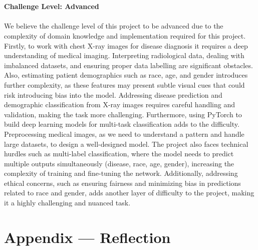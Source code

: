 \documentclass{article}
\begin{document}
\\ \\ 
\textbf{Challenge Level: Advanced} \\ \\ 
We believe the challenge level of this project to be advanced due to the complexity of domain knowledge and implementation required for this project. Firstly, to work with chest X-ray images for disease diagnosis it requires a deep understanding of medical imaging. Interpreting radiological data, dealing with imbalanced datasets, and ensuring proper data labelling are significant obstacles. Also, estimating patient demographics such as race, age, and gender introduces further complexity, as these features may present subtle visual cues that could risk introducing bias into the model. Addressing disease prediction and demographic classification from X-ray images requires careful handling and validation, making the task more challenging.
Furthermore, using PyTorch to build deep learning models for multi-task classification adds to the difficulty. Preprocessing medical images, as we need to understand a pattern and handle large datasets, to design a well-designed model. The project also faces technical hurdles such as multi-label classification, where the model needs to predict multiple outputs simultaneously (disease, race, age, gender), increasing the complexity of training and fine-tuning the network. Additionally, addressing ethical concerns, such as ensuring fairness and minimizing bias in predictions related to race and gender, adds another layer of difficulty to the project, making it a highly challenging and nuanced task.

\newpage{}

\section*{Appendix --- Reflection}

\end{document}
